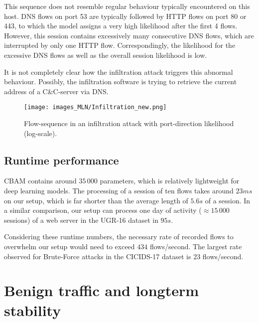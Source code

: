 This sequence does not resemble regular behaviour typically encountered on this host. DNS flows on port 53 are typically followed by HTTP flows on port 80 or 443, to which the model assigns a very high likelihood after the first 4 flows. However, this session contains excessively many consecutive DNS flows, which are interrupted by only one HTTP flow. Correspondingly, the likelihood for the excessive DNS flows as well as the overall session likelihood is low. 

It is not completely clear how the infiltration attack triggers this abnormal behaviour. Possibly, the infiltration software is trying to retrieve the current address of a C\&C-server via DNS.

\begin{figure}[ht]
    \begin{center}
      \texttt{[image: images\_MLN/Infiltration\_new.png]}
    \end{center}

    \caption{Flow-sequence in an infiltration attack with port-direction likelihood (log-scale).}\label{fig:Infiltration}
\end{figure}

\subsection{Runtime performance}

CBAM contains around $35\,000$ parameters, which is relatively lightweight for deep learning models. The processing of a session of ten flows takes around $23ms$ on our setup, which is far shorter than the average length of $5.6s$ of a session. In a similar comparison, our setup can process one day of activity ($\approx 15\,000$ sessions) of a web server in the UGR-16 dataset in $95s$.

Considering these runtime numbers, the necessary rate of recorded flows to overwhelm our setup would need to exceed $434$ flows/second. The largest rate observed for Brute-Force attacks in the CICIDS-17 dataset is $23$ flows/second. 





\section{Benign traffic and longterm stability}\label{sec:Benigntraffic}

